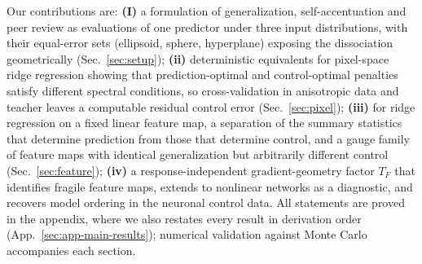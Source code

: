 Our contributions are:
\textbf{(I)} a formulation of generalization, self-accentuation and peer review as evaluations of one predictor under three input distributions, with their equal-error sets (ellipsoid, sphere, hyperplane) exposing the dissociation geometrically (Sec.~\ref{sec:setup});
\textbf{(ii)} deterministic equivalents for pixel-space ridge regression showing that prediction-optimal and control-optimal penalties satisfy different spectral conditions, so cross-validation in anisotropic data and teacher leaves a computable residual control error (Sec.~\ref{sec:pixel});
\textbf{(iii)} for ridge regression on a fixed linear feature map, a separation of the summary statistics that determine prediction from those that determine control, and a gauge family of feature maps with identical generalization but arbitrarily different control (Sec.~\ref{sec:feature});
\textbf{(iv)} a response-independent gradient-geometry factor $T_F$ that identifies fragile feature maps, extends to nonlinear networks as a diagnostic, and recovers model ordering in the neuronal control data.
All statements are proved in the appendix, where we also restates every result in derivation order (App.~\ref{sec:app-main-results}); numerical validation against Monte Carlo accompanies each section. %

